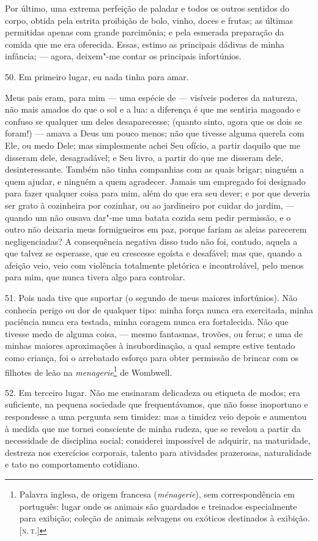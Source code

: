 Por último, uma extrema perfeição de paladar e todos os outros sentidos
do corpo, obtida pela estrita proibição de bolo, vinho, doces e frutas;
as últimas permitidas apenas com grande parcimônia; e pela esmerada
preparação da comida que me era oferecida. Essas, estimo as principais
dádivas de minha infância; --- agora, deixem"-me contar os principais
infortúnios.

50. Em primeiro lugar, eu nada tinha para amar.

Meus pais eram, para mim --- uma espécie de --- visíveis poderes da
natureza, não mais amados do que o sol e a lua: a diferença é que me
sentiria magoado e confuso se qualquer um deles desaparecesse; (quanto
sinto, agora que os dois se foram!) --- amava a Deus um pouco menos; não
que tivesse alguma querela com Ele, ou medo Dele; mas simplesmente achei
Seu ofício, a partir daquilo que me disseram dele, desagradável; e Seu
livro, a partir do que me disseram dele, desinteressante. Também não
tinha companhias com as quais brigar; ninguém a quem ajudar, e ninguém a
quem agradecer. Jamais um empregado foi designado para fazer qualquer
coisa para mim, além do que era seu dever; e por que deveria ser grato à
cozinheira por cozinhar, ou ao jardineiro por cuidar do jardim, ---
quando um não ousava dar"-me uma batata cozida sem pedir permissão, e o
outro não deixaria meus formigueiros em paz, porque fariam as aleias
parecerem negligenciadas? A consequência negativa disso tudo não foi,
contudo, aquela a que talvez se esperasse, que eu crescesse egoísta e
desafável; mas que, quando a afeição veio, veio com violência totalmente
pletórica e incontrolável, pelo menos para mim, que nunca tivera algo
para controlar.

51. Pois nada tive que suportar (o segundo de meus maiores infortúnios).
Não conhecia perigo ou dor de qualquer tipo: minha força nunca era
exercitada, minha paciência nunca era testada, minha coragem nunca era
fortalecida. Não que tivesse medo de alguma coisa, --- mesmo fantasmas,
trovões, ou feras; e uma de minhas maiores aproximações à
insubordinação, a qual sempre estive tentado como criança, foi o
arrebatado esforço para obter permissão de brincar com os filhotes de
leão na \emph{menagerie}\footnote{Palavra inglesa, de origem francesa
  (\emph{ménagerie}), sem correspondência em português: lugar onde os
  animais são guardados e treinados especialmente para exibição; coleção
  de animais selvagens ou exóticos destinados à exibição. {[}\textsc{n.\,t.}{]}}
de Wombwell.

52. Em terceiro lugar. Não me ensinaram delicadeza ou etiqueta de modos;
era suficiente, na pequena sociedade que frequentávamos, que não fosse
inoportuno e respondesse a uma pergunta sem timidez: mas a timidez veio
depois e aumentou à medida que me tornei consciente de minha rudeza, que
se revelou a partir da necessidade de disciplina social; considerei
impossível de adquirir, na maturidade, destreza nos exercícios
corporais, talento para atividades prazerosas, naturalidade e tato no
comportamento cotidiano.

